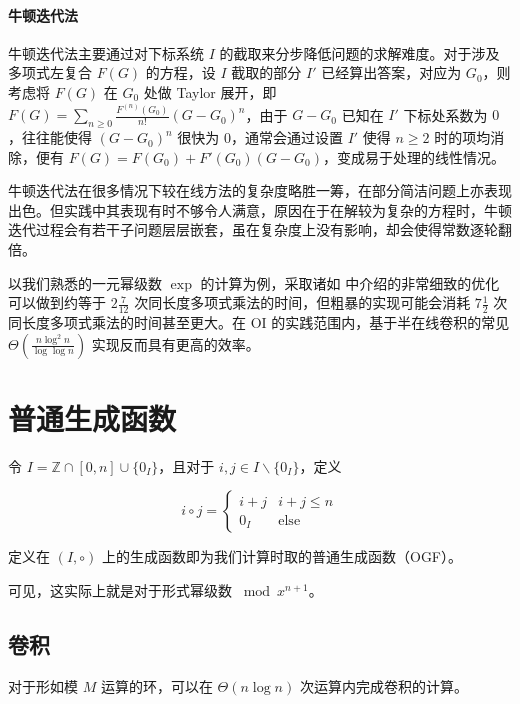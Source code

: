 \paragraph{牛顿迭代法}

牛顿迭代法主要通过对下标系统 $I$ 的截取来分步降低问题的求解难度。对于涉及多项式左复合 $F(G)$ 的方程，设 $I$ 截取的部分 $I'$ 已经算出答案，对应为 $G_0$，则考虑将 $F(G)$ 在 $G_0$ 处做 Taylor 展开，即 $F(G) = \sum_{n\ge 0} \frac{F^{(n)}(G_0)}{n!} (G-G_0)^n$，由于 $G-G_0$ 已知在 $I'$ 下标处系数为 $0$，往往能使得 $(G-G_0)^n$ 很快为 $0$，通常会通过设置 $I'$ 使得 $n\ge 2$ 时的项均消除，便有 $F(G) = F(G_0) + F'(G_0)(G-G_0)$，变成易于处理的线性情况。

牛顿迭代法在很多情况下较在线方法的复杂度略胜一筹，在部分简洁问题上亦表现出色。但实践中其表现有时不够令人满意，原因在于在解较为复杂的方程时，牛顿迭代过程会有若干子问题层层嵌套，虽在复杂度上没有影响，却会使得常数逐轮翻倍。

以我们熟悉的一元幂级数 $\exp$ 的计算为例，采取诸如 \cite{newton} 中介绍的非常细致的优化可以做到约等于 $2\frac 7{12}$ 次同长度多项式乘法的时间，但粗暴的实现可能会消耗 $7\frac 12$ 次同长度多项式乘法的时间甚至更大。在 OI 的实践范围内，基于半在线卷积的常见 $\Theta\left(\frac{n\log ^2 n}{\log \log n}\right)$ 实现反而具有更高的效率。

\section{普通生成函数}

\begin{definition}[普通生成函数]
令 $I=\mathbb Z \cap [0, n] \cup \{0_I\}$，且对于 $i,j \in I\backslash\{0_I\}$，定义

$$
i\circ j =\begin{cases}
i + j & i + j \le n\\
0_I & \mathrm{else}
\end{cases}
$$

定义在 $(I,\circ)$ 上的生成函数即为我们计算时取的普通生成函数（OGF）。

\end{definition}

可见，这实际上就是对于形式幂级数 $\bmod x^{n+1}$。

\subsection{卷积}

\begin{theorem}[快速 Fourier 变换]
对于形如模 $M$ 运算的环，可以在 $\Theta(n\log n)$ 次运算内完成卷积的计算。
\end{theorem}

